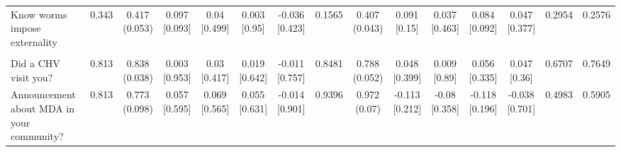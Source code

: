 {\begin{tabular}[t]{lcccccccccccccc}
\hspace{1em}Know worms impose externality & 0.343 & \makecell[c]{0.417\\(0.053)} & \makecell[c]{0.097\\{[0.093]}} & \makecell[c]{0.04\\{[0.499]}} & \makecell[c]{0.003\\{[0.95]}} & \makecell[c]{-0.036\\{[0.423]}} & 0.1565 & \makecell[c]{0.407\\(0.043)} & \makecell[c]{0.091\\{[0.15]}} & \makecell[c]{0.037\\{[0.463]}} & \makecell[c]{0.084\\{[0.092]}} & \makecell[c]{0.047\\{[0.377]}} & 0.2954 & 0.2576\\
\addlinespace[0.3em]
\hline
\multicolumn{15}{l}{\textit{\textbf{Panel D: Implementation, $N=2,407$}}}\\
\hline
\hspace{1em}Did a CHV visit you? & 0.813 & \makecell[c]{0.838\\(0.038)} & \makecell[c]{0.003\\{[0.953]}} & \makecell[c]{0.03\\{[0.417]}} & \makecell[c]{0.019\\{[0.642]}} & \makecell[c]{-0.011\\{[0.757]}} & 0.8481 & \makecell[c]{0.788\\(0.052)} & \makecell[c]{0.048\\{[0.399]}} & \makecell[c]{0.009\\{[0.89]}} & \makecell[c]{0.056\\{[0.335]}} & \makecell[c]{0.047\\{[0.36]}} & 0.6707 & 0.7649\\
\hspace{1em}Announcement about MDA in your community? & 0.813 & \makecell[c]{0.773\\(0.098)} & \makecell[c]{0.057\\{[0.595]}} & \makecell[c]{0.069\\{[0.565]}} & \makecell[c]{0.055\\{[0.631]}} & \makecell[c]{-0.014\\{[0.901]}} & 0.9396 & \makecell[c]{0.972\\(0.07)} & \makecell[c]{-0.113\\{[0.212]}} & \makecell[c]{-0.08\\{[0.358]}} & \makecell[c]{-0.118\\{[0.196]}} & \makecell[c]{-0.038\\{[0.701]}} & 0.4983 & 0.5905\\

\end{tabular}}
